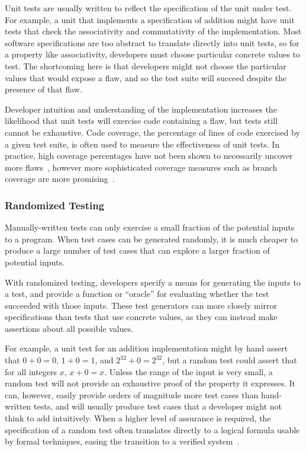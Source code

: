 Unit tests are usually written to reflect the specification of the
unit under test. For example, a unit that implements a specification
of addition might have unit tests that check the associativity and
commutativity of the implementation. Most software specifications are
too abstract to translate directly into unit tests, so for a property
like associativity, developers must choose particular concrete values
to test. The shortcoming here is that developers might not choose the
particular values that would expose a flaw, and so the test suite
will succeed despite the presence of that flaw.

Developer intuition and understanding of the implementation increases
the likelihood that unit tests will exercise code containing a flaw,
but tests still cannot be exhaustive. Code coverage, the percentage of
lines of code exercised by a given test suite, is often used to
measure the effectiveness of unit tests. In practice, high coverage
percentages have not been shown to necessarily uncover more
flaws~\cite{inozemtseva2014coverage}, however more sophisticated
coverage measures such as branch coverage are more
promising~\cite{gligoric2013comparing}.

\subsubsection{Randomized Testing}

Manually-written tests can only exercise a small fraction of the
potential inputs to a program. When test cases can be generated
randomly, it is much cheaper to produce a large number of test cases
that can explore a larger fraction of potential inputs.

With randomized testing, developers specify a means for generating the
inputs to a test, and provide a function or ``oracle'' for evaluating
whether the test succeeded with those inputs. These test generators
can more closely mirror specifications than tests that use concrete
values, as they can instead make assertions about all possible
values.

For example, a unit test for an addition implementation might by hand
assert that $0+0=0$, $1+0=1$, and $2^{32}+0=2^{32}$, but a random test
could assert that for all integers $x$, $x+0=x$. Unless the range of
the input is very small, a random test will not provide an exhaustive
proof of the property it expresses. It can, however, easily provide
orders of magnitude more test cases than hand-written tests, and will
usually produce test cases that a developer might not think to add
intuitively. When a higher level of assurance is required, the
specification of a random test often translates directly to a logical
formula usable by formal techniques, easing the transition to a
verified system~\cite{swierstra2012xmonad}.


